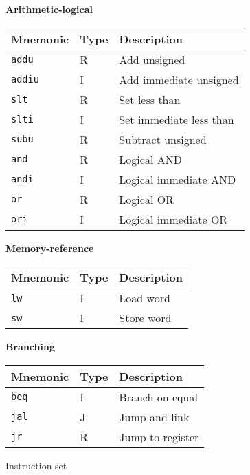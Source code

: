 \documentclass[11pt,twoside,a4paper]{article}
\begin{document}
\begin{figure}[H]
	\begin{multicols}{2}
	\center

	\textbf{Arithmetic-logical} \\
	\vspace{0.15in}
	\begin{tabular}{|l|l|l|}
		\hline
		\scriptsize {\bf Mnemonic} &
		\scriptsize {\bf Type} &
		\scriptsize {\bf Description} \\
		\hline {\tt addu} & R & \scriptsize Add unsigned \\
		\hline {\tt addiu} & I & \scriptsize Add immediate unsigned \\
		\hline {\tt slt} & R & \scriptsize Set less than \\
		\hline {\tt slti} & I & \scriptsize Set immediate less than \\
		\hline {\tt subu} & R & \scriptsize Subtract unsigned \\
		\hline {\tt and} & R & \scriptsize Logical AND \\
		\hline {\tt andi} & I & \scriptsize Logical immediate AND \\
		\hline {\tt or} & R & \scriptsize Logical OR \\
		\hline {\tt ori} & I & \scriptsize Logical immediate OR \\
		\hline
	\end{tabular}
	
	\columnbreak
	\center

	\textbf{Memory-reference} \\
	\vspace{0.15in}
	\begin{tabular}{|l|l|l|}
		\hline
		\scriptsize {\bf Mnemonic} &
		\scriptsize {\bf Type} &
		\scriptsize {\bf Description} \\
		\hline {\tt lw} & I & \scriptsize Load word \\
		\hline {\tt sw} & I & \scriptsize Store word \\
		\hline
	\end{tabular}

	\vspace{0.26in}
	\textbf{Branching} \\
	\vspace{0.15in}
	\begin{tabular}{|l|l|l|}
		\hline
		\scriptsize {\bf Mnemonic} &
		\scriptsize {\bf Type} &
		\scriptsize {\bf Description} \\
		\hline {\tt beq} & I & \scriptsize Branch on equal \\
		\hline {\tt jal} & J & \scriptsize Jump and link \\
		\hline {\tt jr} & R & \scriptsize Jump to register \\
		\hline
	\end{tabular}

	\end{multicols}
	\caption{Instruction set}
	\label{fig:instruction-set}
\end{figure}
\end{document}
